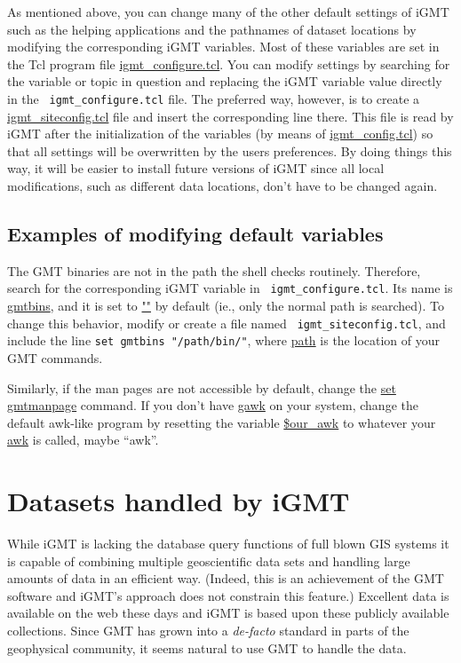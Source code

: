 \documentclass[11pt]{article}
\begin{document}
As mentioned above, you can change many of the other default settings
of iGMT such as the helping applications and the pathnames of dataset
locations by modifying the corresponding iGMT variables. Most of these
variables are set in the Tcl program file \url{igmt_configure.tcl}.
You can modify settings by searching for the variable or topic in
question and replacing the iGMT variable value directly in the {\tt
  igmt\_configure.tcl} file.  The preferred way, however, is to create
a \url{igmt_siteconfig.tcl} file and insert the corresponding line
there. This file is read by iGMT after the initialization of the
variables (by means of \url{igmt_config.tcl}) so that all settings
will be overwritten by the users preferences. By doing things this
way, it will be easier to install future versions of iGMT since all
local modifications, such as different data locations, don't have to
be changed again.

\subsection{Examples of modifying default variables}

The GMT binaries are not in the path the shell checks routinely.
Therefore, search for the corresponding iGMT variable in {\tt
  igmt\_configure.tcl}. Its name is \url{gmtbins}, and it is set to
\url{""} by default (ie., only the normal path is searched). To change
this behavior, modify or create a file named {\tt
  igmt\_siteconfig.tcl}, and include the line {\tt set gmtbins
  "/path/bin/"}, where \url{path} is the location of your GMT
commands.

Similarly, if the man pages are not accessible by default, change the
\url{set gmtmanpage} command.  If you don't have \url{gawk} on your
system, change the default awk-like program by resetting the variable
\url{$our_awk} to whatever your \url{awk} is called, maybe ``awk''.


\section{Datasets handled by iGMT\label{datasets}}

While iGMT is lacking the database query functions of full blown GIS
systems it is capable of combining multiple geoscientific data sets
and handling large amounts of data in an efficient way. (Indeed, this
is an achievement of the GMT software and iGMT's approach does not
constrain this feature.) Excellent data is available on the web these
days and iGMT is based upon these publicly available collections.
Since GMT has grown into a {\em de-facto} standard in parts of the
geophysical community, it seems natural to use GMT to handle the data.
\end{document}
